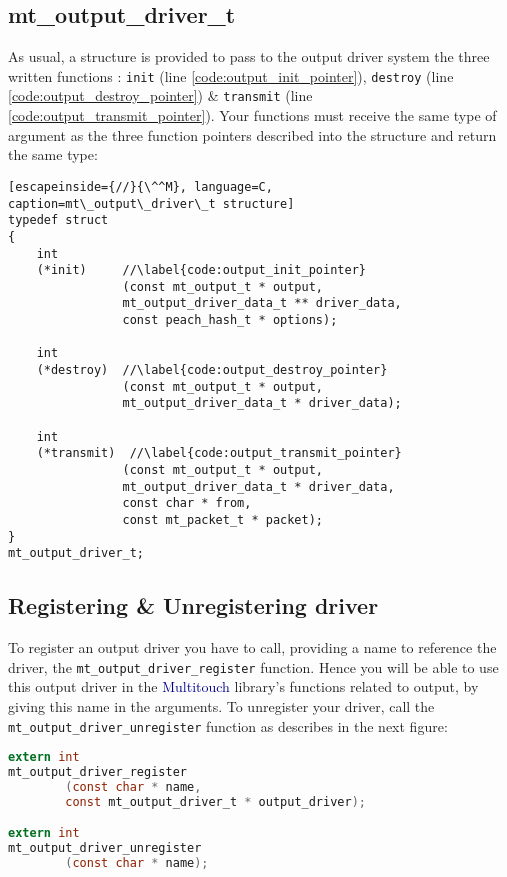 \subsection{mt\_output\_driver\_t}
\label{sect:output_output_driver_t}
As usual, a structure is provided to pass to the output driver system the
three written functions : \texttt{init}
(line \ref{code:output_init_pointer}), 
\texttt{destroy} (line \ref{code:output_destroy_pointer}) \& 
\texttt{transmit} (line \ref{code:output_transmit_pointer}). Your functions 
must receive the same type of argument as the three function pointers 
described into the structure and return the same type:
\begin{lstlisting}[escapeinside={//}{\^^M}, language=C,
caption=mt\_output\_driver\_t structure]
typedef struct 
{
    int 
    (*init)     //\label{code:output_init_pointer}
                (const mt_output_t * output,
                mt_output_driver_data_t ** driver_data, 
                const peach_hash_t * options);

    int 
    (*destroy)  //\label{code:output_destroy_pointer}
                (const mt_output_t * output,
                mt_output_driver_data_t * driver_data);

    int
    (*transmit)  //\label{code:output_transmit_pointer}
                (const mt_output_t * output,
                mt_output_driver_data_t * driver_data,
                const char * from,
                const mt_packet_t * packet);
}
mt_output_driver_t;
\end{lstlisting}

%
%
\subsection{Registering \& Unregistering driver}
\label{sect:output_driver_register}
\label{sect:output_driver_unregister}
To register an output driver you have to call, providing a name 
to reference the driver, the \texttt{mt\_output\_driver\_register} 
function. Hence you will be able to use this output driver in the 
\textcolor{darkblue}{Multitouch} library's functions related to output,
by giving this name in the arguments.
To unregister your driver, call the \texttt{mt\_output\_driver\_unregister} 
function as describes in the next figure:
\begin{lstlisting}[language=C,
caption=Output's driver management functions]
extern int
mt_output_driver_register
        (const char * name,
        const mt_output_driver_t * output_driver);

extern int
mt_output_driver_unregister
        (const char * name);
\end{lstlisting}

